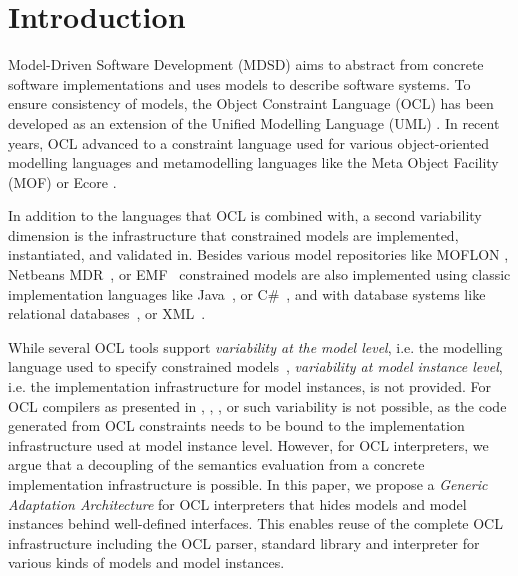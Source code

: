 \section{Introduction}
	
	Model-Driven Software Development (MDSD) aims to abstract from concrete 
	software implementations and uses models to describe software systems. 
	To ensure consistency of models, the Object Constraint Language 
	(OCL) \cite{spec:OCL2-2} has been developed as an extension of the Unified 
	Modelling Language (UML) \cite{spec:UML2-2}\cite{warmer:ocl}. In recent years,
	OCL advanced to a constraint language used for various object-oriented
	modelling languages \cite{detaching} and metamodelling languages like the Meta
	Object Facility (MOF) \cite{UmlMof} or Ecore \cite{WWW:MDT}.

	In addition to the languages that OCL is combined with, a second variability
	dimension is the infrastructure that constrained models are implemented, 
	instantiated, and validated in. Besides various model repositories
	like MOFLON \cite{MOFLON}, Netbeans MDR~\cite{UmlMof}, or EMF~\cite{WWW:MDT}
	constrained models are also implemented using classic implementation languages like
	Java~\cite{demuthRGWS09}, or C\#~\cite{OCLCsharp}, and with database systems
	like relational databases~\cite{OCLRelDB}, or XML~\cite{OCLXML}. 
	
	While several OCL tools support \emph{variability at the model level}, i.e.
	the modelling language used to specify constrained
	models~\cite{braeuerOCL07}\cite{akehurst2003ocl}, \emph{variability at model
	instance level}, i.e. the implementation infrastructure for model instances, is not provided. For OCL compilers as presented in
	\cite{UmlMof}, \cite{demuthRGWS09}, \cite{OCLCsharp}, or \cite{OCLRelDB} 
	such variability is not possible, as the code generated from OCL constraints 
	needs to be	bound to the implementation infrastructure used at model instance
	level. However, for OCL interpreters, we argue that a decoupling of the
	semantics evaluation from a concrete implementation infrastructure is possible.
	In this paper, we propose a \emph{Generic Adaptation Architecture} for OCL
	interpreters that hides models and model instances behind well-defined
	interfaces. This enables reuse of the complete OCL infrastructure including the OCL parser, 
	standard library and interpreter for various kinds of models and model instances.
	
